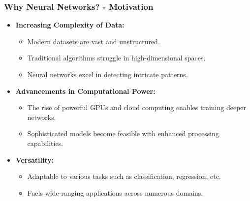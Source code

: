 \documentclass[aspectratio=169]{beamer}
\begin{document}
\begin{frame}[fragile]
    \frametitle{Why Neural Networks? - Motivation}
    \begin{itemize}
        \item \textbf{Increasing Complexity of Data:} 
        \begin{itemize}
            \item Modern datasets are vast and unstructured.
            \item Traditional algorithms struggle in high-dimensional spaces.
            \item Neural networks excel in detecting intricate patterns.
        \end{itemize}
        
        \item \textbf{Advancements in Computational Power:} 
        \begin{itemize}
            \item The rise of powerful GPUs and cloud computing enables training deeper networks.
            \item Sophisticated models become feasible with enhanced processing capabilities.
        \end{itemize}

        \item \textbf{Versatility:}
        \begin{itemize}
            \item Adaptable to various tasks such as classification, regression, etc.
            \item Fuels wide-ranging applications across numerous domains.
        \end{itemize}
    \end{itemize}
\end{frame}
\end{document}
